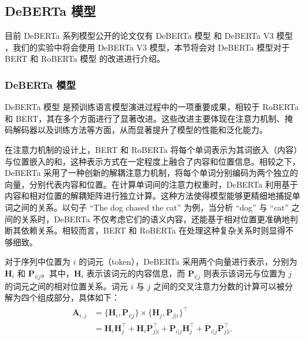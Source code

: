 \subsection{DeBERTa 模型}
\label{sec:method-pretrain-deberta}

目前 DeBERTa 系列模型公开的论文仅有 DeBERTa 模型 \cite{he_deberta_2021} 和 DeBERTa V3 模型 \cite{he2023debertav3improvingdebertausing}，我们的实验中将会使用 DeBERTa V3 模型，本节将会对 DeBERTa 模型对于 BERT \cite{devlin_bert_2019} 和 RoBERTa 模型 \cite{liu_roberta_2019} 的改进进行介绍。

\subsubsection{DeBERTa 模型}

DeBERTa 模型 \cite{he_deberta_2021} 是预训练语言模型演进过程中的一项重要成果，相较于 RoBERTa 和 BERT，其在多个方面进行了显著改进。这些改进主要体现在注意力机制、掩码解码器以及训练方法等方面，从而显著提升了模型的性能和泛化能力。

在注意力机制的设计上，BERT 和 RoBERTa 将每个单词表示为其词嵌入（内容）与位置嵌入的和，这种表示方式在一定程度上融合了内容和位置信息。相较之下，DeBERTa 采用了一种创新的解耦注意力机制，将每个单词分别编码为两个独立的向量，分别代表内容和位置。在计算单词间的注意力权重时，DeBERTa 利用基于内容和相对位置的解耦矩阵进行独立计算。这种方法使得模型能够更精细地捕捉单词之间的关系。以句子 “The dog chased the cat” 为例，当分析 “dog” 与 “cat” 之间的关系时，DeBERTa 不仅考虑它们的语义内容，还能基于相对位置更准确地判断其依赖关系。相较而言，BERT 和 RoBERTa 在处理这种复杂关系时则显得不够细致。

对于序列中位置为 \(i\) 的词元（token），DeBERTa 采用两个向量进行表示，分别为 \(\mathbf{H}_{i}\) 和 \(\mathbf{P}_{i|j}\)。其中，\(\mathbf{H}_{i}\) 表示该词元的内容信息，而 \(\mathbf{P}_{i|j}\) 则表示该词元与位置为 \(j\) 的词元之间的相对位置关系。词元 \(i\) 与 \(j\) 之间的交叉注意力分数的计算可以被分解为四个组成部分，具体如下：
\begin{align}
\label{eq:deberta-attention}
\begin{split}
\mathbf{A}_{i, j} & = \{\mathbf{H}_{i}, \mathbf{P}_{i | j}\} \times \{\mathbf{H}_{j}, \mathbf{P}_{j | i}\}^{\intercal} \\
& = \mathbf{H}_{i}\mathbf{H}_{j}^{\intercal}+\mathbf{H}_{i}\mathbf{P}_{j | i}^{\intercal}+\mathbf{P}_{i | j}\mathbf{H}_{j}^{\intercal}+\mathbf{P}_{i | j}\mathbf{P}_{j | i}^{\intercal}.
\end{split}
\end{align}

